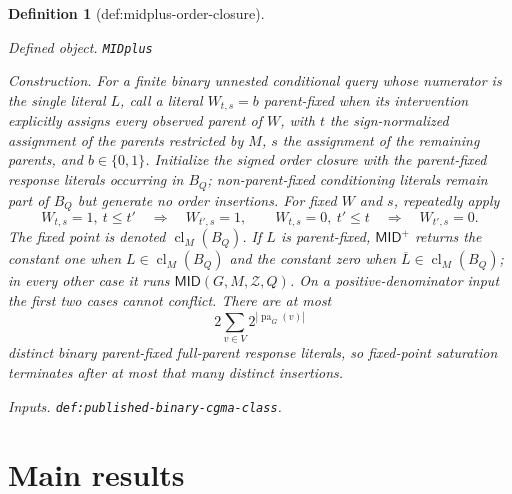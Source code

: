 \documentclass{article}
\newtheorem{definition}{Definition}
\begin{document}
\begin{definition}[def:midplus-order-closure]\label{def:midplus-order-closure}
\par\smallskip\noindent\emph{Defined object.} \texttt{MIDplus}
\par\smallskip\noindent\emph{Construction.} For a finite binary unnested conditional query whose numerator is the single literal \(L\), call a literal \(W_{t,s}=b\) parent-fixed when its intervention explicitly assigns every observed parent of \(W\), with \(t\) the sign-normalized assignment of the parents restricted by \(M\), \(s\) the assignment of the remaining parents, and \(b\in\{0,1\}\).  Initialize the signed order closure with the parent-fixed response literals occurring in \(B_Q\); non-parent-fixed conditioning literals remain part of \(B_Q\) but generate no order insertions.  For fixed \(W\) and \(s\), repeatedly apply
\[
 W_{t,s}=1,\ t\le t'
 \quad\Longrightarrow\quad W_{t',s}=1,
 \qquad
 W_{t,s}=0,\ t'\le t
 \quad\Longrightarrow\quad W_{t',s}=0.
\tag{1}
\]
The fixed point is denoted \(\operatorname{cl}_M(B_Q)\).  If \(L\) is parent-fixed, \(\mathsf{MID}^{+}\) returns the constant one when \(L\in\operatorname{cl}_M(B_Q)\) and the constant zero when \(\overline L\in\operatorname{cl}_M(B_Q)\); in every other case it runs \(\mathsf{MID}(G,M,\mathcal Z,Q)\).  On a positive-denominator input the first two cases cannot conflict.  There are at most
\[
 2\sum_{v\in V}2^{|\operatorname{pa}_G(v)|}
\]
distinct binary parent-fixed full-parent response literals, so fixed-point saturation terminates after at most that many distinct insertions.
\par\smallskip\noindent\emph{Inputs.} \texttt{def:\allowbreak{}published-\allowbreak{}binary-\allowbreak{}cgma-\allowbreak{}class}.
\end{definition}

\section{Main results}
\end{document}
